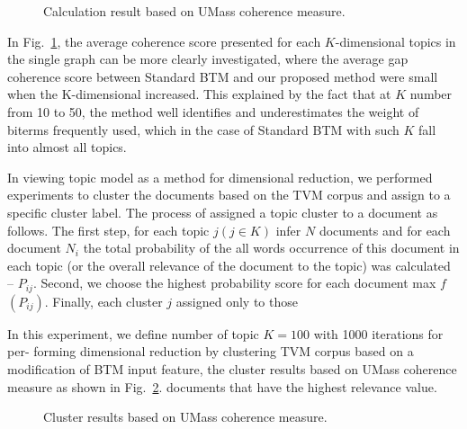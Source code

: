 \begin{figure}[ht]
	\caption{Calculation result based on UMass coherence measure.}\label{fig:umassCalculationResults}
\end{figure}

In Fig.~\cref{fig:umassCalculationResults}, the average coherence score presented for each \(K\)-dimensional topics in the single graph can be more clearly investigated, where the average gap coherence score between Standard BTM and our proposed method were small when the K-dimensional increased. This explained by the fact that at \(K\) number from 10 to 50, the method well identifies and underestimates the weight of biterms frequently used, which in the case of Standard BTM with such \(K\) fall into almost all topics.

In viewing topic model as a method for dimensional reduction, we performed experiments to cluster the documents based on the TVM corpus and assign to a specific cluster label. The process of assigned a topic cluster to a document as follows. The first step, for each topic \(j (j \in K)\) infer \(N\) documents and for each document \(N_i\) the total probability of the all words occurrence of this document in each topic (or the overall relevance of the document to the topic) was calculated -- \(P_{ij}\). Second, we choose the highest probability score for each document max \(f\) \((P_{ij})\). Finally, each cluster \(j\) assigned only to those 

In this experiment, we define number of topic \(K = 100\) with 1000 iterations for per- forming dimensional reduction by clustering TVM corpus based on a modification of BTM input feature, the cluster results based on UMass coherence measure as shown in Fig.~\cref{fig:umassClusterResults}.
documents that have the highest relevance value.

\begin{figure}[ht]
	\caption{Cluster results based on UMass coherence measure.}\label{fig:umassClusterResults}
\end{figure}

